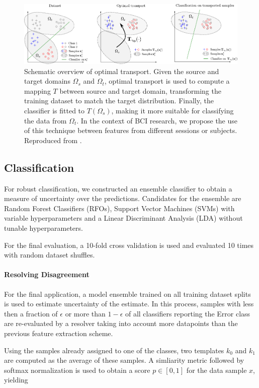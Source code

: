 \documentclass[10pt,a4paper]{article}
\begin{document}
\begin{figure}
    \includegraphics[width=\textwidth]{img/ot.pdf}
    \caption{Schematic overview of optimal transport. Given the source and target domains $\Omega_s$ and $\Omega_t$, optimal transport is used to compute a mapping $T$ between source and target domain, transforming the training dataset to match the target distribution.
    Finally, the classifier is fitted to $T(\Omega_s)$, making it more suitable for classifying the data from $\Omega_t$.
    In the context of BCI research, we propose the use of this technique between features from different sessions or subjects.
    Reproduced from \cite{Courty}.}
    \label{fig:optimal-transport}
\end{figure}

\subsection{Classification}

For robust classification, we constructed an ensemble classifier to obtain a measure of uncertainty over the predictions.
Candidates for the ensemble are Random Forest Classifiers (RFOs), Support Vector Machines (SVMs) with variable hyperparameters and a Linear Discriminant Analysis (LDA) without tunable hyperparameters.

For the final evaluation, a 10-fold cross validation is used and evaluated 10 times with random dataset shuffles.

\paragraph{Resolving Disagreement}

For the final application, a model ensemble trained on all training dataset splits is used to estimate uncertainty of the estimate.
In this process, samples with less then a fraction of $\epsilon$ or more than $1-\epsilon$ of all classifiers reporting the Error class are re-evaluated by a resolver taking into account more datapoints than the previous feature extraction scheme.

Using the samples already assigned to one of the classes, two templates $k_0$ and $k_1$ are computed as the average of these samples.
A simliarity metric followed by softmax normalization is used to obtain a score $p \in [ 0, 1 ]$ for the data sample $x$, yielding
\end{document}
